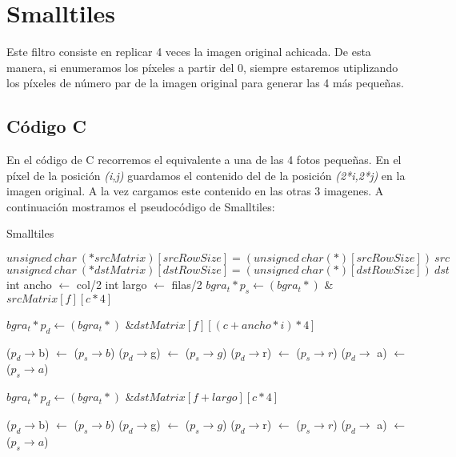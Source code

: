 \section{Smalltiles}
Este filtro consiste en replicar 4 veces la imagen original achicada. De esta manera, si enumeramos los píxeles a partir del 0, siempre estaremos utiplizando los píxeles de número par de la imagen original para generar las 4 más pequeñas.
\subsection{Código C}
	En el código de C recorremos el equivalente a una de las 4 fotos pequeñas. En el píxel de la posición \emph{(i,j)} guardamos el contenido del de la posición \emph{(2*i,2*j)} en la imagen original. A la vez cargamos este contenido en las otras 3 imagenes.
	A continuación mostramos el pseudocódigo de Smalltiles:
\begin{algorithm}[h!]
\caption{Smalltiles}
\begin{algorithmic}
	\State $unsigned~ char~ (*srcMatrix)[srcRowSize] = (unsigned~ char (*)[srcRowSize])~ src$
	\State $unsigned~ char~ (*dstMatrix)[dstRowSize] = (unsigned~ char (*)[dstRowSize])~ dst$
	\State int ancho $\gets$ col/2
	\State int largo $\gets$ filas/2
			\State $bgra_t* p_s \gets (bgra_t*)$ \& $srcMatrix[f][c * 4]$
				
				\State $bgra_t *p_d \gets (bgra_t*)$ \&$dstMatrix[f][(c + ancho*i) * 4]$
				
				\State ($p_d \rightarrow$b) $\gets$ ($p_s \rightarrow b$)
				\State ($p_d \rightarrow$g) $\gets$ ($p_s \rightarrow g$)
				\State ($p_d \rightarrow$r) $\gets$ ($p_s \rightarrow r$)
				\State ($p_d \rightarrow$ a) $\gets$ ($p_s \rightarrow a$)
			\EndFor
				
				\State $bgra_t *p_d \gets (bgra_t*)$ \&$dstMatrix[f + largo][c * 4]$
				
				\State ($p_d \rightarrow$b) $\gets$ ($p_s \rightarrow b$)
				\State ($p_d \rightarrow$g) $\gets$ ($p_s \rightarrow g$)
				\State ($p_d \rightarrow$r) $\gets$ ($p_s \rightarrow r$)
				\State ($p_d \rightarrow$ a) $\gets$ ($p_s \rightarrow a$)
			\EndFor
		\EndFor
	\EndFor
\EndFunction
\end{algorithmic} 
\end{algorithm}
	
